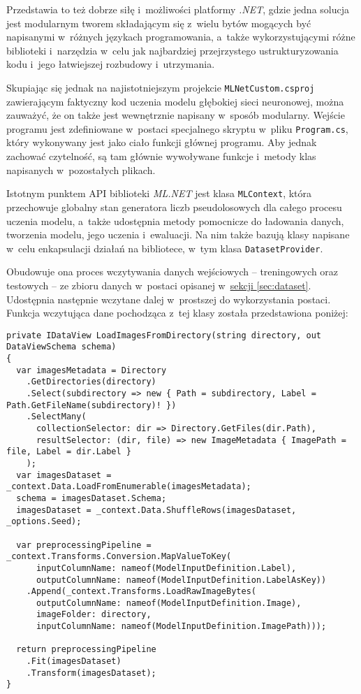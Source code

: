 Przedstawia to też dobrze siłę i~możliwości platformy \emph{.NET}, gdzie jedna solucja jest modularnym tworem składającym się z~wielu bytów mogących być napisanymi w~różnych językach programowania, a~także wykorzystującymi różne biblioteki i~narzędzia w~celu jak najbardziej przejrzystego ustrukturyzowania kodu i~jego łatwiejszej rozbudowy i~utrzymania.

Skupiając się jednak na najistotniejszym projekcie \lstinline{MLNetCustom.csproj} zawierającym faktyczny kod uczenia modelu głębokiej sieci neuronowej, można zauważyć, że on także jest wewnętrznie napisany w~sposób modularny.
Wejście programu jest zdefiniowane w~postaci specjalnego skryptu w~pliku \lstinline{Program.cs}, który wykonywany jest jako ciało funkcji głównej programu.
Aby jednak zachować czytelność, są tam głównie wywoływane funkcje i~metody klas napisanych w~pozostałych plikach.

Istotnym punktem API biblioteki \emph{ML.NET} jest klasa \lstinline{MLContext}, która przechowuje globalny stan generatora liczb pseudolosowych dla całego procesu uczenia modelu, a~także udostępnia metody pomocnicze do ładowania danych, tworzenia modelu, jego uczenia i~ewaluacji.
Na nim także bazują klasy napisane w~celu enkapsulacji działań na bibliotece, w~tym klasa \lstinline{DatasetProvider}.

Obudowuje ona proces wczytywania danych wejściowych -- treningowych oraz testowych -- ze zbioru danych w~postaci opisanej w~\hyperref[sec:dataset]{sekcji \ref*{sec:dataset}}.
Udostępnia następnie wczytane dalej w~prostszej do wykorzystania postaci.
Funkcja wczytująca dane pochodząca z~tej klasy została przedstawiona poniżej:

\begin{lstlisting}[language={[Sharp]C}]
private IDataView LoadImagesFromDirectory(string directory, out DataViewSchema schema)
{
  var imagesMetadata = Directory
    .GetDirectories(directory)
    .Select(subdirectory => new { Path = subdirectory, Label = Path.GetFileName(subdirectory)! })
    .SelectMany(
      collectionSelector: dir => Directory.GetFiles(dir.Path),
      resultSelector: (dir, file) => new ImageMetadata { ImagePath = file, Label = dir.Label }
    );
  var imagesDataset = _context.Data.LoadFromEnumerable(imagesMetadata);
  schema = imagesDataset.Schema;
  imagesDataset = _context.Data.ShuffleRows(imagesDataset, _options.Seed);

  var preprocessingPipeline = _context.Transforms.Conversion.MapValueToKey(
      inputColumnName: nameof(ModelInputDefinition.Label),
      outputColumnName: nameof(ModelInputDefinition.LabelAsKey))
    .Append(_context.Transforms.LoadRawImageBytes(
      outputColumnName: nameof(ModelInputDefinition.Image),
      imageFolder: directory,
      inputColumnName: nameof(ModelInputDefinition.ImagePath)));

  return preprocessingPipeline
    .Fit(imagesDataset)
    .Transform(imagesDataset);
}
\end{lstlisting}

